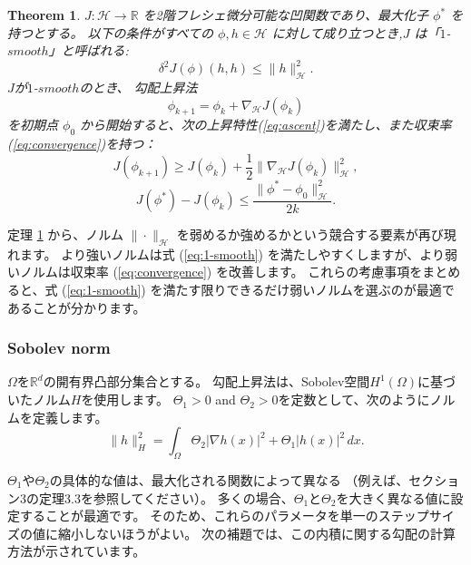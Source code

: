 \documentclass{jsarticle}
\newtheorem{thm}{Theorem}[section]
\theoremstyle{definition}
\begin{document}
{\color{teal}
\begin{thm}
    \label{thm:chose norm}
    $J: \mathcal{H} \rightarrow \mathbb{R}$ を2階フレシェ微分可能な凹関数であり、最大化子 $\phi^*$ を持つとする。
    以下の条件がすべての $\phi, h \in \mathcal{H}$ に対して成り立つとき,$J$ は「$1$-$smooth$」と呼ばれる:
    \begin{equation}
        \label{eq:1-smooth}
        \delta^2 J(\phi)(h, h) \leq \|h\|_\mathcal{H}^2.
    \end{equation}
    $J$が$1$-$smooth$のとき、
    勾配上昇法 
    $$
        \phi_{k+1} = \phi_k + \nabla_\mathcal{H} J(\phi_k)
    $$
    を初期点 $\phi_0$ から開始すると、次の上昇特性(\ref{eq:ascent})を満たし、また収束率(\ref{eq:convergence})を持つ：
    \begin{equation}
        \label{eq:ascent}
        J(\phi_{k+1}) \geq J(\phi_k) + \frac{1}{2}\|\nabla_\mathcal{H} J(\phi_k)\|_\mathcal{H}^2,
    \end{equation}
    \begin{equation}
        \label{eq:convergence}
        J(\phi^*) - J(\phi_k) \leq \frac{\|\phi^* - \phi_0\|_\mathcal{H}^2}{2k}.
    \end{equation}
\end{thm}
}

定理 \ref{thm:chose norm} から、ノルム $\|\cdot\|_\mathcal{H}$ を弱めるか強めるかという競合する要素が再び現れます。
より強いノルムは式 (\ref{eq:1-smooth}) を満たしやすくしますが、より弱いノルムは収束率 (\ref{eq:convergence}) を改善します。
これらの考慮事項をまとめると、式 (\ref{eq:1-smooth}) を満たす限りできるだけ弱いノルムを選ぶのが最適であることが分かります。


\subsubsection{Sobolev norm}

$\Omega$を$\mathbb{R}^d$の開有界凸部分集合とする。
勾配上昇法は、Sobolev空間$H^1(\Omega)$に基づいたノルム$H$を使用します。
$\Theta_1 > 0$ and $\Theta_2 > 0$を定数として、次のようにノルムを定義します。
\begin{equation}
    \label{eq:norm}
    \|h\|_H^2 = \int_{\Omega} \Theta_2 |\nabla h(x)|^2 + \Theta_1 |h(x)|^2 \, dx.
\end{equation}

$\Theta_1$や$\Theta_2$の具体的な値は、最大化される関数によって異なる
（例えば、セクション3の定理3.3を参照してください）。
{\color{red}
多くの場合、$\Theta_1$と$\Theta_2$を大きく異なる値に設定することが最適です。
}
そのため、これらのパラメータを単一のステップサイズの値に縮小しないほうがよい。
次の補題では、この内積に関する勾配の計算方法が示されています。
\end{document}
